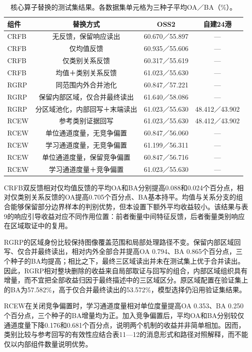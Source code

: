 \documentclass[journal,10pt,a4paper]{IEEEtran}
\begin{document}
\begin{table}[H]
\centering\footnotesize
\setcounter{table}{13}
\caption{核心算子替换的测试集结果。各数据集单元格为三种子平均OA／BA（\%）。}
\label{tab:14}
\setlength{\tabcolsep}{3pt}\renewcommand{\arraystretch}{1.2}
\begin{tabularx}{\linewidth}{LCCC}
\toprule
组件 & 替换方式 & OSS2 & 自建24港 \\
\midrule
CRFB & 无反馈，保留响应读出 & 60.670／55.897 & --- \\
CRFB & 仅均值反馈 & 60.935／55.606 & --- \\
CRFB & 仅类别关系反馈 & 60.317／55.619 & --- \\
CRFB & 均值＋类别关系反馈 & 61.023／55.630 & --- \\
RGRP & 同范围内外合并池化 & 60.847／57.221 & --- \\
RGRP & 保留内部区域，仅合并最终读出 & 61.640／58.086 & --- \\
RGRP & 分区域池化，内部回写＋末端读出 & 61.023／55.630 & 48.412／43.902 \\
RCEW & 参考类别证据回写 & 61.023／55.630 & 48.412／43.902 \\
RCEW & 单位通道度量，无竞争偏置 & 60.847／56.060 & --- \\
RCEW & 学习通道度量，无竞争偏置 & 61.199／56.311 & --- \\
RCEW & 单位通道度量，保留竞争偏置 & 60.847／56.716 & --- \\
RCEW & 学习通道度量＋竞争偏置 & 61.023／55.630 & --- \\
\bottomrule
\end{tabularx}
\end{table}

CRFB双反馈相对仅均值反馈的平均OA和BA分别提高0.088和0.024个百分点，相对仅类别关系反馈的OA提高0.705个百分点、BA基本持平。均值与关系分支的组合能够保留部分边界样本的判别优势，但本设置下额外平均收益较小。该结果与表9的响应引导收益对应不同作用位置：前者衡量中间特征反馈，后者衡量类别响应在区域取证中的复用。

RGRP的区域身份比较保持图像覆盖范围和局部处理路径不变。保留内部区域回写、仅合并最终读出，相对内外全部合并提高OA 0.794、BA 0.865个百分点，三个种子的BA均提高；相比之下，最终三区域读出并未在测试集上优于合并读出。因此，RGRP相对整块删除的收益来自局部取证与回写的组合，内部区域组织具有增量，而不宜把全部收益归因于最终描述中的三区域区分。原区域配置在验证集上的BA为57.582\%，高于仅合并最终读出的53.572\%，模型选择仍沿用验证集结果。

RCEW在关闭竞争偏置时，学习通道度量相对单位度量提高OA 0.353、BA 0.250个百分点，三个种子的BA增量均为正。加入竞争偏置后，平均OA和BA分别较仅通道度量下降0.176和0.681个百分点，说明两个机制的收益并非简单相加。因而，类别比较与参考回写的有效性应结合表11---12的消息形式和路径对照解释，而不能仅以内部组件数量说明优势。
\end{document}
